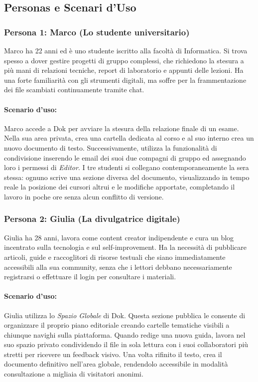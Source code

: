 \documentclass[11pt,a4paper]{report}
\begin{document}
\subsection{Personas e Scenari d'Uso}

\subsubsection{Persona 1: Marco (Lo studente universitario)}
Marco ha 22 anni ed è uno studente iscritto alla facoltà di Informatica. Si trova spesso a dover gestire progetti di gruppo complessi, che richiedono la stesura a più mani di relazioni tecniche, report di laboratorio e appunti delle lezioni. Ha una forte familiarità con gli strumenti digitali, ma soffre per la frammentazione dei file scambiati continuamente tramite chat.

\paragraph{Scenario d'uso:} Marco accede a Dok per avviare la stesura della relazione finale di un esame. Nella sua area privata, crea una cartella dedicata al corso e al suo interno crea un nuovo documento di testo. Successivamente, utilizza la funzionalità di condivisione inserendo le email dei suoi due compagni di gruppo ed assegnando loro i permessi di \textit{Editor}. I tre studenti si collegano contemporaneamente la sera stessa: ognuno scrive una sezione diversa del documento, visualizzando in tempo reale la posizione dei cursori altrui e le modifiche apportate, completando il lavoro in poche ore senza alcun conflitto di versione.

\subsubsection{Persona 2: Giulia (La divulgatrice digitale)}
Giulia ha 28 anni, lavora come content creator indipendente e cura un blog incentrato sulla tecnologia e sul self-improvement. Ha la necessità di pubblicare articoli, guide e raccoglitori di risorse testuali che siano immediatamente accessibili alla sua community, senza che i lettori debbano necessariamente registrarsi o effettuare il login per consultare i materiali.

\paragraph{Scenario d'uso:} Giulia utilizza lo \textit{Spazio Globale} di Dok. Questa sezione pubblica le consente di organizzare il proprio piano editoriale creando cartelle tematiche visibili a chiunque navighi sulla piattaforma. Quando redige una nuova guida, lavora nel suo spazio privato condividendo il file in sola lettura con i suoi collaboratori più stretti per ricevere un feedback visivo. Una volta rifinito il testo, crea il documento definitivo nell'area globale, rendendolo accessibile in modalità consultazione a migliaia di visitatori anonimi.
\end{document}
